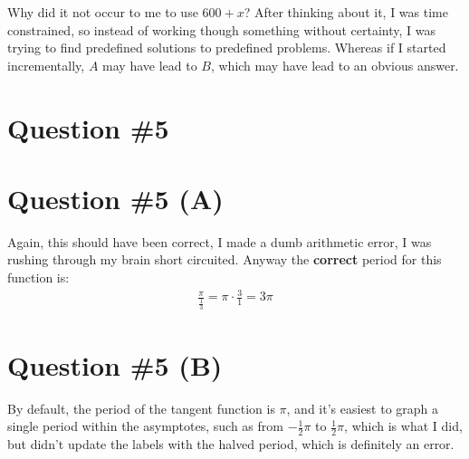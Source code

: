 Why did it not occur to me to use $600 + x$? After thinking about it, I was time constrained, so instead of working though something without certainty, I was trying to find predefined solutions to predefined problems. Whereas if I started incrementally, $A$ may have lead to $B$, which may have lead to an obvious answer.







\section*{Question \#5}

\section*{Question \#5 (A)}

Again, this should have been correct, I made a dumb arithmetic error, I was rushing through my brain short circuited. Anyway the \textbf{correct} period for this function is:
\begin{equation}
\begin{split}
\frac{\pi}{\frac{1}{3}} = \pi \cdot \frac{3}{1} = 3\pi
\end{split}
\end{equation}

\answer{$3\pi$}

\newpage
\section*{Question \#5 (B)}

By default, the period of the tangent function is $\pi$, and it's easiest to graph a single period within the asymptotes, such as from $-\frac{1}{2}\pi$ to $\frac{1}{2}\pi$, which is what I did, but didn't update the labels with the halved period, which is definitely an error. 




